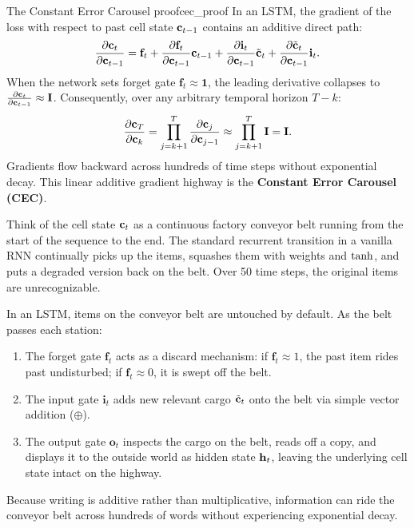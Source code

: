 \documentclass[../../main.tex]{subfiles}
\begin{document}
\begin{theorem}{The Constant Error Carousel proof}{cec_proof}
In an LSTM, the gradient of the loss with respect to past cell state $\mathbf{c}_{t-1}$ contains an additive direct path:
\begin{equation}
\label{eq:cec_gradient}
\frac{\partial \mathbf{c}_t}{\partial \mathbf{c}_{t-1}} = \mathbf{f}_t + \frac{\partial \mathbf{f}_t}{\partial \mathbf{c}_{t-1}} \mathbf{c}_{t-1} + \frac{\partial \mathbf{i}_t}{\partial \mathbf{c}_{t-1}} \tilde{\mathbf{c}}_t + \frac{\partial \tilde{\mathbf{c}}_t}{\partial \mathbf{c}_{t-1}} \mathbf{i}_t.
\end{equation}
When the network sets forget gate $\mathbf{f}_t \approx \mathbf{1}$, the leading derivative collapses to $\frac{\partial \mathbf{c}_t}{\partial \mathbf{c}_{t-1}} \approx \mathbf{I}$. Consequently, over any arbitrary temporal horizon $T - k$:
\begin{equation}
\label{eq:cec_chain}
\frac{\partial \mathbf{c}_T}{\partial \mathbf{c}_k} = \prod_{j=k+1}^T \frac{\partial \mathbf{c}_j}{\partial \mathbf{c}_{j-1}} \approx \prod_{j=k+1}^T \mathbf{I} = \mathbf{I}.
\end{equation}
Gradients flow backward across hundreds of time steps without exponential decay. This linear additive gradient highway is the \textbf{Constant Error Carousel (CEC)}.
\end{theorem}

\begin{intuition}
Think of the cell state $\mathbf{c}_t$ as a continuous factory conveyor belt running from the start of the sequence to the end. The standard recurrent transition in a vanilla RNN continually picks up the items, squashes them with weights and $\tanh$, and puts a degraded version back on the belt. Over 50 time steps, the original items are unrecognizable.

In an LSTM, items on the conveyor belt are untouched by default. As the belt passes each station:
\begin{enumerate}
    \item The forget gate $\mathbf{f}_t$ acts as a discard mechanism: if $\mathbf{f}_t \approx 1$, the past item rides past undisturbed; if $\mathbf{f}_t \approx 0$, it is swept off the belt.
    \item The input gate $\mathbf{i}_t$ adds new relevant cargo $\tilde{\mathbf{c}}_t$ onto the belt via simple vector addition ($\oplus$).
    \item The output gate $\mathbf{o}_t$ inspects the cargo on the belt, reads off a copy, and displays it to the outside world as hidden state $\mathbf{h}_t$, leaving the underlying cell state intact on the highway.
\end{enumerate}
Because writing is additive rather than multiplicative, information can ride the conveyor belt across hundreds of words without experiencing exponential decay.
\end{intuition}
\end{document}
